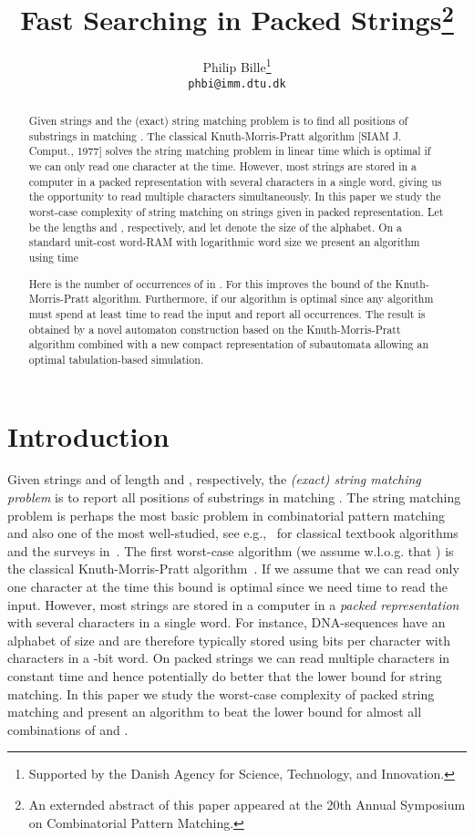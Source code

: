 \documentclass{article}
\title{Fast Searching in Packed Strings\footnote{An externded abstract of this paper appeared at the 20th Annual Symposium on Combinatorial Pattern Matching.}}
\author{Philip Bille\thanks{Supported by the Danish Agency for Science, Technology, and Innovation.}  \\  {\tt phbi@imm.dtu.dk}}
\begin{document}
\maketitle

\begin{abstract}
Given strings  and  the (exact) string matching problem is to find all positions of substrings in  matching . The classical Knuth-Morris-Pratt algorithm [SIAM J. Comput., 1977] solves the string matching problem in linear time which is optimal if we can only read one character at the time. However, most strings are stored in a computer in a packed representation with several characters in a single word, giving us the opportunity to read multiple characters simultaneously. In this paper we study the worst-case complexity of string matching on strings given in packed representation. Let  be the lengths  and , respectively, and let  denote the size of the alphabet. On a standard unit-cost word-RAM with logarithmic word size we present an algorithm using time 

Here  is the number of occurrences of  in . For 
this improves the  bound of the Knuth-Morris-Pratt algorithm.
Furthermore, if  our algorithm is optimal
since any algorithm must spend at least 
time to read the input and report all occurrences. The result is
obtained by a novel automaton construction based on the
Knuth-Morris-Pratt algorithm combined with a new compact
representation of subautomata allowing an optimal tabulation-based
simulation. \end{abstract}



\section{Introduction}
Given strings  and  of length  and , respectively, the
\emph{(exact) string matching problem} is to report all positions of
substrings in  matching . The string matching problem is perhaps
the most basic problem in combinatorial pattern matching and also one
of the most well-studied, see e.g.,~\cite{KMP1977, BM1977,KR1987,
  BYG1992} for classical textbook algorithms and the surveys
in~\cite{Gusfield1997, NR2002}. The first worst-case  algorithm
(we assume w.l.o.g. that ) is the classical
Knuth-Morris-Pratt algorithm~\cite{KMP1977}. If we assume that we can
read only one character at the time this bound is optimal since we
need  time to read the input. However, most strings are
stored in a computer in a \emph{packed representation} with several
characters in a single word. For instance, DNA-sequences have an
alphabet of size  and are therefore typically stored using  bits
per character with  characters in a -bit word. On packed
strings we can read multiple characters in constant time and hence
potentially do better that the  lower bound for string
matching. In this paper we study the worst-case complexity of packed
string matching and present an algorithm to beat the  lower
bound for almost all combinations of  and .
\end{document}
